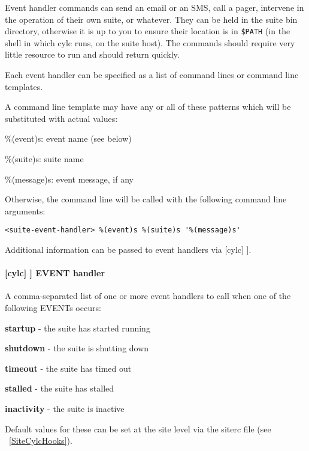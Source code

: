 Event handler commands can send an email or an SMS, call a pager, intervene in
the operation of their own suite, or whatever.
They can be held in the suite bin directory, otherwise it is up to you
to ensure their location is in \lstinline=$PATH= (in the shell in which
cylc runs, on the suite host). The commands should require
very little resource to run and should return quickly.

Each event handler can be specified as a list of command lines or command
line templates.

A command line template may have any or all of these patterns which will be
substituted with actual values:
\begin{myitemize}
    \item \%(event)s: event name (see below)
    \item \%(suite)s: suite name
    \item \%(message)s: event message, if any
\end{myitemize}

Otherwise, the command line will be called with the following command line
arguments:
\begin{lstlisting}
<suite-event-handler> %(event)s %(suite)s '%(message)s'
\end{lstlisting}

Additional information can be passed to event handlers via
[cylc] \textrightarrow [[environment]].

\paragraph[EVENT handler]{[cylc] \textrightarrow [[events]] \textrightarrow EVENT handler}

A comma-separated list of one or more event handlers to call when one of the
following EVENTs occurs:
\begin{myitemize}
    \item {\bf startup}  - the suite has started running
    \item {\bf shutdown} - the suite is shutting down
    \item {\bf timeout}  - the suite has timed out
    \item {\bf stalled} - the suite has stalled
    \item {\bf inactivity} - the suite is inactive
\end{myitemize}

Default values for these can be set at the site level via the siterc file
(see ~\ref{SiteCylcHooks}).


